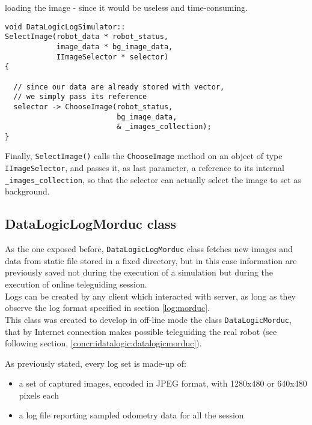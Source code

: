 loading the image - since it would be useless and time-consuming.
\\
\begin{lstlisting}[caption={\texttt{DataLogicLogSimulator::SelectImage()} method},
    label={code:datalogiclogsimulator:selectimage}]
void DataLogicLogSimulator::
SelectImage(robot_data * robot_status,
            image_data * bg_image_data,
            IImageSelector * selector)
{

  // since our data are already stored with vector,
  // we simply pass its reference
  selector -> ChooseImage(robot_status, 
                          bg_image_data, 
                          & _images_collection);
}
\end{lstlisting}

Finally, \texttt{SelectImage()} calls the \texttt{ChooseImage} method 
on an object of type \texttt{IImageSelector}, and passes it, as last 
parameter, a reference to its internal \texttt{\_images\_collection}, 
so that the selector can actually select the image to set as 
background.


\subsection{DataLogicLogMorduc class}
\label{concr:idatalogic:datalogiclogmorduc}

As the one exposed before, \texttt{DataLogicLogMorduc} class
fetches new images and data from static file
stored in a fixed directory, but in this case information are previously saved
not during the execution of a simulation but during
the execution of online teleguiding session.
\\
Logs can be created by any client which interacted with \morduc{}
server, as long as they observe the log format specified in section
\ref{log:morduc}.
\\
This class was created to develop in off-line mode the class
\texttt{DataLogicMorduc}, that by Internet connection makes possible
teleguiding the real robot (see following section,
\ref{concr:idatalogic:datalogicmorduc}).

As previously stated, every log set is made-up of:

\begin{itemize}
  \item a set of captured images, encoded in JPEG format,
    with 1280x480 or 640x480 pixels each
  \item a log file reporting sampled odometry data
    for all the session
\end{itemize}

